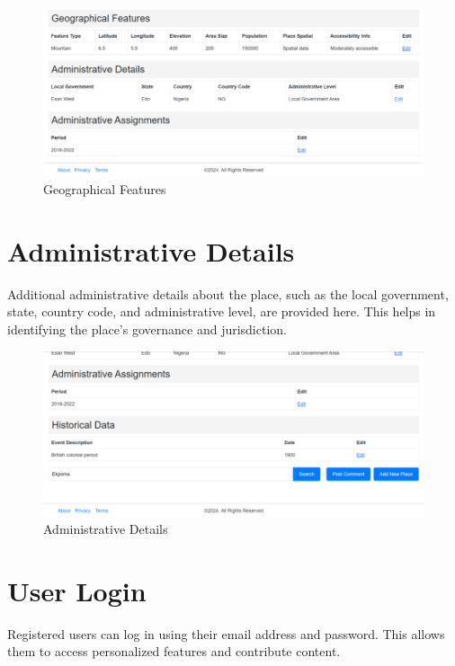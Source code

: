 \begin{figure}[H]
    \centering
    \includegraphics[width=\textwidth]{moreDetails2Geo.png}
    \caption{Geographical Features}
    \label{fig:moreDetails2Geo}
\end{figure}

\section{Administrative Details}
Additional administrative details about the place, such as the local government, state, country code, and administrative level, are provided here. This helps in identifying the place's governance and jurisdiction.

\begin{figure}[H]
    \centering
    \includegraphics[width=\textwidth]{moreDetails3AdmDetails.png}
    \caption{Administrative Details}
    \label{fig:moreDetails3AdmDetails}
\end{figure}

\section{User Login}
Registered users can log in using their email address and password. This allows them to access personalized features and contribute content.

